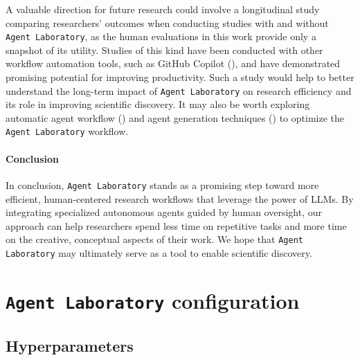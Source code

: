 \documentclass[11pt, a4paper]{gdm_format}
\begin{document}
A valuable direction for future research could involve a longitudinal study comparing researchers' outcomes when conducting studies with and without \texttt{Agent Laboratory}, as the human evaluations in this work provide only a snapshot of its utility. Studies of this kind have been conducted with other workflow automation tools, such as GitHub Copilot (\cite{dohmke2023sea, ziegler2024measuring}), and have demonstrated promising potential for improving productivity. Such a study would help to better understand the long-term impact of \texttt{Agent Laboratory} on research efficiency and its role in improving scientific discovery. It may also be worth exploring automatic agent workflow (\cite{li2024autoflow,zhugegptswarm, hong2023metagpt, zhang2024aflow}) and agent generation techniques (\cite{chen2023autoagents, hu2024automated}) to optimize the \texttt{Agent Laboratory} workflow.

\paragraph{Conclusion} In conclusion, \texttt{Agent Laboratory} stands as a promising step toward more efficient, human-centered research workflows that leverage the power of LLMs. By integrating specialized autonomous agents guided by human oversight, our approach can help researchers spend less time on repetitive tasks and more time on the creative, conceptual aspects of their work. We hope that \texttt{Agent Laboratory} may ultimately serve as a tool to enable scientific discovery.





\clearpage

\appendix

\section{\texttt{Agent Laboratory} configuration}

\subsection{Hyperparameters}
\end{document}
